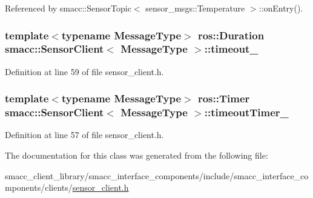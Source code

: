 Referenced by smacc\+::\+Sensor\+Topic$<$ sensor\+\_\+msgs\+::\+Temperature $>$\+::on\+Entry().

\subsubsection[{\texorpdfstring{timeout\+\_\+}{timeout_}}]{\setlength{\rightskip}{0pt plus 5cm}template$<$typename Message\+Type$>$ ros\+::\+Duration {\bf smacc\+::\+Sensor\+Client}$<$ Message\+Type $>$\+::timeout\+\_\+\hspace{0.3cm}{\ttfamily [private]}}\hypertarget{classsmacc_1_1SensorClient_a6552f9676fa48d438937c53829ef8f32}{}\label{classsmacc_1_1SensorClient_a6552f9676fa48d438937c53829ef8f32}


Definition at line 59 of file sensor\+\_\+client.\+h.

\subsubsection[{\texorpdfstring{timeout\+Timer\+\_\+}{timeoutTimer_}}]{\setlength{\rightskip}{0pt plus 5cm}template$<$typename Message\+Type$>$ ros\+::\+Timer {\bf smacc\+::\+Sensor\+Client}$<$ Message\+Type $>$\+::timeout\+Timer\+\_\+\hspace{0.3cm}{\ttfamily [private]}}\hypertarget{classsmacc_1_1SensorClient_a5a82e2fa1f0ccfe2564125fae2f9783a}{}\label{classsmacc_1_1SensorClient_a5a82e2fa1f0ccfe2564125fae2f9783a}


Definition at line 57 of file sensor\+\_\+client.\+h.



The documentation for this class was generated from the following file\+:\begin{DoxyCompactItemize}
\item 
smacc\+\_\+client\+\_\+library/smacc\+\_\+interface\+\_\+components/include/smacc\+\_\+interface\+\_\+components/clients/\hyperlink{sensor__client_8h}{sensor\+\_\+client.\+h}\end{DoxyCompactItemize}
